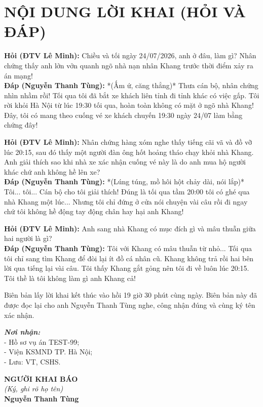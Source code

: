 \documentclass[12pt,a4paper]{article}
\begin{document}
\section*{NỘI DUNG LỜI KHAI (HỎI VÀ ĐÁP)}

\noindent \textbf{Hỏi (ĐTV Lê Minh):} Chiều và tối ngày 24/07/2026, anh ở đâu, làm gì? Nhân chứng thấy anh lởn vởn quanh ngõ nhà nạn nhân Khang trước thời điểm xảy ra án mạng!\\
\textbf{Đáp (Nguyễn Thanh Tùng):} *(Ấm ứ, căng thẳng)* Thưa cán bộ, nhân chứng nhìn nhầm rồi! Tối qua tôi đã bắt xe khách liên tỉnh đi tỉnh khác có việc gấp. Tôi rời khỏi Hà Nội từ lúc 19:30 tối qua, hoàn toàn không có mặt ở ngõ nhà Khang! Đây, tôi có mang theo cuống vé xe khách chuyến 19:30 ngày 24/07 làm bằng chứng đây!

\noindent \textbf{Hỏi (ĐTV Lê Minh):} Nhân chứng hàng xóm nghe thấy tiếng cãi vã và đồ vỡ lúc 20:15, sau đó thấy một người đàn ông hốt hoảng tháo chạy khỏi nhà Khang. Anh giải thích sao khi nhà xe xác nhận cuống vé này là do anh mua hộ người khác chứ anh không hề lên xe?\\
\textbf{Đáp (Nguyễn Thanh Tùng):} *(Lúng túng, mồ hôi hột chảy dài, nói lắp)* Tôi... tôi... Cán bộ cho tôi giải thích! Đúng là tối qua tầm 20:00 tôi có ghé qua nhà Khang một lúc... Nhưng tôi chỉ đứng ở cửa nói chuyện vài câu rồi đi ngay chứ tôi không hề động tay động chân hay hại anh Khang!

\noindent \textbf{Hỏi (ĐTV Lê Minh):} Anh sang nhà Khang có mục đích gì và mâu thuẫn giữa hai người là gì?\\
\textbf{Đáp (Nguyễn Thanh Tùng):} Tôi với Khang có mâu thuẫn từ nhỏ... Tối qua tôi chỉ sang tìm Khang để đòi lại ít đồ cá nhân cũ. Khang không trả rồi hai bên lời qua tiếng lại vài câu. Tôi thấy Khang gắt gỏng nên tôi đi về luôn lúc 20:15. Tôi thề là tôi không làm gì anh Khang cả!

\noindent Biên bản lấy lời khai kết thúc vào hồi 19 giờ 30 phút cùng ngày. Biên bản này đã được đọc lại cho anh Nguyễn Thanh Tùng nghe, công nhận đúng và cùng ký tên xác nhận.

\vspace{0.8cm}

\noindent
\begin{minipage}[t]{0.45\textwidth}
    \small
    \textbf{\textit{Nơi nhận:}}\\
    - Hồ sơ vụ án TEST-99;\\
    - Viện KSMND TP. Hà Nội;\\
    - Lưu: VT, CSHS.
\end{minipage}
\hfill
\begin{minipage}[t]{0.5\textwidth}
    \begin{center}
        \small
        \textbf{NGƯỜI KHAI BÁO}\\
        \textit{(Ký, ghi rõ họ tên)}\\[1.5cm]
        \textbf{Nguyễn Thanh Tùng}
    \end{center}
\end{minipage}
\end{document}
